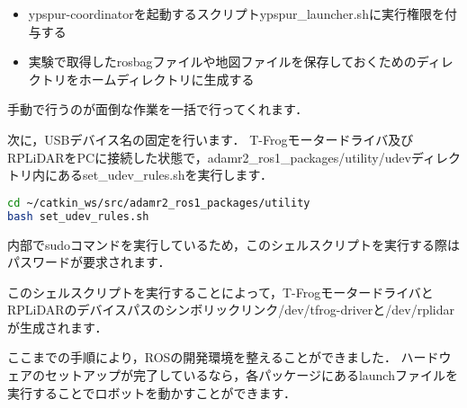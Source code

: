 \documentclass[{../../master}]{subfiles}
\begin{document}
\begin{itemize}
  \item \textsf{ypspur-coordinator}を起動するスクリプト\textsf{ypspur\_launcher.sh}に実行権限を付与する
  \item 実験で取得した\textsf{rosbag}ファイルや地図ファイルを保存しておくためのディレクトリをホームディレクトリに生成する
\end{itemize}

\noindent
手動で行うのが面倒な作業を一括で行ってくれます．

次に，USBデバイス名の固定を行います．
T-Frogモータードライバ及びRPLiDARをPCに接続した状態で，\textsf{adamr2\_ros1\_packages/utility/udev}ディレクトリ内にある\textsf{set\_udev\_rules.sh}を実行します．

\begin{lstlisting}[language=sh, caption=udev rulesの設定]
cd ~/catkin_ws/src/adamr2_ros1_packages/utility
bash set_udev_rules.sh
\end{lstlisting}

\noindent
内部で\textsf{sudo}コマンドを実行しているため，このシェルスクリプトを実行する際はパスワードが要求されます．

このシェルスクリプトを実行することによって，T-FrogモータードライバとRPLiDARのデバイスパスのシンボリックリンク\textsf{/dev/tfrog-driver}と\textsf{/dev/rplidar}が生成されます．

ここまでの手順により，ROSの開発環境を整えることができました．
ハードウェアのセットアップが完了しているなら，各パッケージにある\textsf{launch}ファイルを実行することでロボットを動かすことができます．
\end{document}
